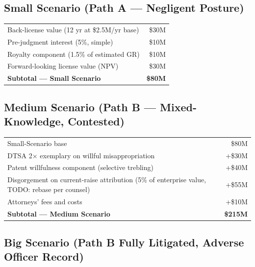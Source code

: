 \documentclass[11pt,letterpaper]{article}
\begin{document}
\subsection*{Small Scenario (Path A --- Negligent Posture)}

\begin{center}
\begin{tabular}{lr}
\toprule
Back-license value (12 yr at \$2.5M/yr base) & \$30M \\
Pre-judgment interest (5\%, simple) & \$10M \\
Royalty component (1.5\% of estimated GR) & \$10M \\
Forward-looking license value (NPV) & \$30M \\
\midrule
\textbf{Subtotal --- Small Scenario} & \textbf{\$80M} \\
\bottomrule
\end{tabular}
\end{center}

\subsection*{Medium Scenario (Path B --- Mixed-Knowledge, Contested)}

\begin{center}
\begin{tabular}{lr}
\toprule
Small-Scenario base & \$80M \\
DTSA 2$\times$ exemplary on willful misappropriation & +\$30M \\
Patent willfulness component (selective trebling) & +\$40M \\
Disgorgement on current-raise attribution (5\% of enterprise value, TODO: rebase per counsel) & +\$55M \\
Attorneys' fees and costs & +\$10M \\
\midrule
\textbf{Subtotal --- Medium Scenario} & \textbf{\$215M} \\
\bottomrule
\end{tabular}
\end{center}

\subsection*{Big Scenario (Path B Fully Litigated, Adverse Officer Record)}
\end{document}
